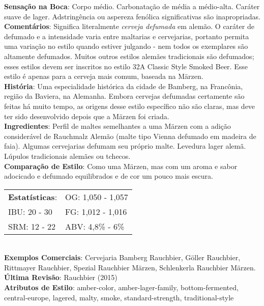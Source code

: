 \textbf{Sensação na Boca}: Corpo médio. Carbonatação de média a médio-alta. Caráter suave de lager. Adstringência ou aspereza fenólica significativas são inapropriadas. \\
\textbf{Comentários}: Significa literalmente \textit{cerveja defumada} em alemão. O caráter de defumado e a intensidade varia entre maltarias e cervejarias, portanto permita uma variação no estilo quando estiver julgando - nem todos os exemplares são altamente defumados. Muitos outros estilos alemães tradicionais são defumados; esses estilos devem ser inscritos no estilo 32A Classic Style Smoked Beer. Esse estilo é apenas para a cerveja mais comum, baseada na Märzen. \\
\textbf{História}: Uma especialidade histórica da cidade de Bamberg, na Francônia, região da Baviera, na Alemanha. Embora cervejas defumadas certamente são feitas há muito tempo, as origens desse estilo específico não são claras, mas deve ter sido desenvolvido depois que a Märzen foi criada. \\
\textbf{Ingredientes}: Perfil de maltes semelhantes a uma Märzen com a adição considerável de Rauchmalz Alemão (malte tipo Vienna defumado em madeira de faia). Algumas cervejarias defumam seu próprio malte. Levedura lager alemã. Lúpulos tradicionais alemães ou tchecos. \\
\textbf{Comparação de Estilo}: Como uma Märzen, mas com um aroma e sabor adocicado e defumado equilibrados e de cor um pouco mais escura. \\
\begin{tabular}{@{}p{35mm}p{35mm}@{}}
  \textbf{Estatísticas}: & OG: 1,050 - 1,057 \\
  IBU: 20 - 30  & FG: 1,012 - 1,016  \\
  SRM: 12 - 22  & ABV: 4,8\% - 6\%
\end{tabular}\\
\textbf{Exemplos Comerciais}: Cervejaria Bamberg Rauchbier, Göller Rauchbier, Rittmayer Rauchbier, Spezial Rauchbier Märzen, Schlenkerla Rauchbier Märzen. \\
\textbf{Última Revisão}: Rauchbier (2015) \\
\textbf{Atributos de Estilo}: amber-color, amber-lager-family, bottom-fermented, central-europe, lagered, malty, smoke, standard-strength, traditional-style
